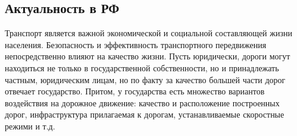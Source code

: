 \documentclass[a4paper, 14pt]{article}
\begin{document}
\subsection{Актуальность в РФ} 
Транспорт является важной экономической и социальной составляющей жизни населения. Безопасность и эффективность транспортного передвижения непосредственно влияют на качество жизни. Пусть юридически, дороги могут находиться не только в государственной собственности, но и принадлежать частным, юридическим лицам, но по факту за качество большей части дорог отвечает государство. Притом, у государства есть множество вариантов воздействия на дорожное движение: качество и расположение построенных дорог, инфраструктура прилагаемая к дорогам, устанавливаемые скоростные режими и т.д.  


\newpage
\end{document}

